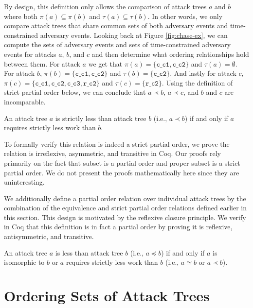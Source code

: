 \documentclass[runningheads]{llncs}
\theoremstyle{definition}
\begin{document}
\noindent By design, this definition only allows the comparison of attack trees $a$ and $b$ where both $\pi(a) \subseteq \pi(b)$ and $\tau(a) \subseteq \tau(b)$. In other words, we only compare attack trees that share common sets of both adversary events and time-constrained adversary events. Looking back at Figure \ref{fig:chase-ex}, we can compute the sets of adversary events and sets of time-constrained adversary events for attacks $a$, $b$, and $c$ and then determine what ordering relationships hold between them. For attack $a$ we get that $\pi(a) = \{ \texttt{c\_c1}, \texttt{c\_c2} \}$ and $\tau(a) = \emptyset$. For attack $b$, $\pi(b) = \{ \texttt{c\_c1}, \texttt{c\_c2} \}$ and $\tau(b) = \{ \texttt{c\_c2} \}$. And lastly for attack $c$, $\pi(c) = \{ \texttt{c\_c1}, \texttt{c\_c2}, \texttt{c\_c3}, \texttt{r\_c2} \}$ and $\tau(c) = \{ \texttt{r\_c2} \}$. Using the definition of strict partial order below, we can conclude that $a \prec b$, $a \prec c$, and $b$ and $c$ are incomparable.

\begin{definition}
    An attack tree $a$ is strictly less than attack tree $b$ (i.e., $a \prec b$) if and only if $a$ requires strictly less work than $b$.
\end{definition}

To formally verify this relation is indeed a strict partial order, we prove the relation is irreflexive, asymmetric, and transitive in Coq. Our proofs rely primarily on the fact that subset is a partial order and proper subset is a strict partial order. We do not present the proofs mathematically here since they are uninteresting.

We additionally define a partial order relation over individual attack trees by the combination of the equivalence and strict partial order relations defined earlier in this section. This design is motivated by the reflexive closure principle. We verify in Coq that this definition is in fact a partial order by proving it is reflexive, antisymmetric, and transitive.

\begin{definition}
  An attack tree $a$ is less than attack tree $b$ (i.e., $a \preceq b$) if and only if $a$ is isomorphic to $b$ or $a$ requires strictly less work than $b$ (i.e., $a \simeq b$ or $a \prec b$).
\end{definition}


\section{Ordering Sets of Attack Trees}
\end{document}
